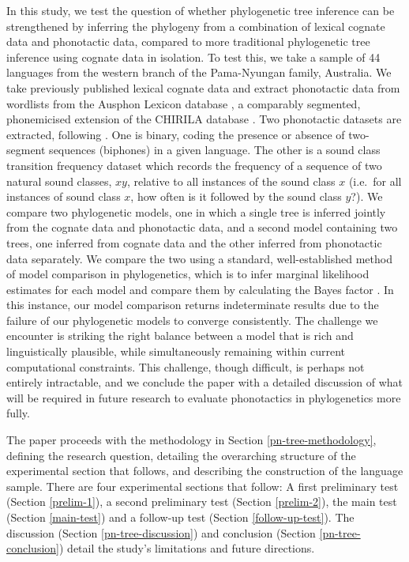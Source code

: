 \documentclass[]{article}
\begin{document}
In this study, we test the question of whether phylogenetic tree inference can be strengthened by inferring the phylogeny from a combination of lexical cognate data and phonotactic data, compared to more traditional phylogenetic tree inference using cognate data in isolation. To test this, we take a sample of 44 languages from the western branch of the Pama-Nyungan family, Australia. We take previously published lexical cognate data \autocite{bouckaert_origin_2018} and extract phonotactic data from wordlists from the Ausphon Lexicon database \autocite{round_ausphon-lexicon_2017}, a comparably segmented, phonemicised extension of the CHIRILA database \autocite{bowern_chirila_2016}. Two phonotactic datasets are extracted, following \textcite{macklin-cordes_phylogenetic_2020}. One is binary, coding the presence or absence of two-segment sequences (biphones) in a given language. The other is a sound class transition frequency dataset which records the frequency of a sequence of two natural sound classes, \(xy\), relative to all instances of the sound class \(x\) (i.e.~for all instances of sound class \(x\), how often is it followed by the sound class \(y\)?). We compare two phylogenetic models, one in which a single tree is inferred jointly from the cognate data and phonotactic data, and a second model containing two trees, one inferred from cognate data and the other inferred from phonotactic data separately. We compare the two using a standard, well-established method of model comparison in phylogenetics, which is to infer marginal likelihood estimates for each model and compare them by calculating the Bayes factor \autocites{kass_bayes_1995}{brown_importance_2007}. In this instance, our model comparison returns indeterminate results due to the failure of our phylogenetic models to converge consistently. The challenge we encounter is striking the right balance between a model that is rich and linguistically plausible, while simultaneously remaining within current computational constraints. This challenge, though difficult, is perhaps not entirely intractable, and we conclude the paper with a detailed discussion of what will be required in future research to evaluate phonotactics in phylogenetics more fully.

The paper proceeds with the methodology in Section \ref{pn-tree-methodology}, defining the research question, detailing the overarching structure of the experimental section that follows, and describing the construction of the language sample. There are four experimental sections that follow: A first preliminary test (Section \ref{prelim-1}), a second preliminary test (Section \ref{prelim-2}), the main test (Section \ref{main-test}) and a follow-up test (Section \ref{follow-up-test}). The discussion (Section \ref{pn-tree-discussion}) and conclusion (Section \ref{pn-tree-conclusion}) detail the study's limitations and future directions.
\end{document}
